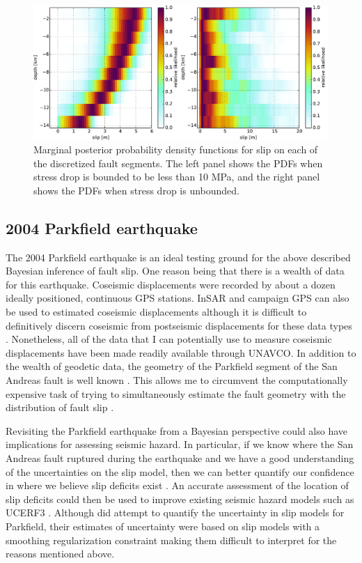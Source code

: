 \documentclass[12pt]{article}
\begin{document}
\begin{figure}
\includegraphics[width=1.0\textwidth]{figure_2}
\raggedleft
\caption{Marginal posterior probability density functions for slip on each of the discretized fault segments.  The left panel shows the PDFs when stress drop is bounded to be less than 10 MPa, and the right panel shows the PDFs when stress drop is unbounded.}  
\end{figure}

\subsection*{2004 Parkfield earthquake}
The 2004 Parkfield earthquake is an ideal testing ground for the above described Bayesian inference of fault slip.  One reason being that there is a wealth of data for this earthquake. Coseismic displacements were recorded by about a dozen ideally positioned, continuous GPS stations. InSAR and campaign GPS can also be used to estimated coseismic displacements although it is difficult to definitively discern coseismic from postseismic displacements for these data types \citep{Johanson2006}. Nonetheless, all of the data that I can potentially use to measure coseismic displacements have been made readily available through UNAVCO.  In addition to the wealth of geodetic data, the geometry of the Parkfield segment of the San Andreas fault is well known \citep{Simpson2006}.  This allows me to circumvent the computationally expensive task of trying to simultaneously estimate the fault geometry with the distribution of fault slip \citep[e.g.][]{Fukuda2008}. 

Revisiting the Parkfield earthquake from a Bayesian perspective could also have implications for assessing seismic hazard.  In particular, if we know where the San Andreas fault ruptured during the earthquake and we have a good understanding of the uncertainties on the slip model, then we can better quantify our confidence in where we believe slip deficits exist \citep{Murray2006}.  An accurate assessment of the location of slip deficits could then be used to improve existing seismic hazard models such as UCERF3 \citep{Field2014}.  Although \citet{Page2009} did attempt to quantify the uncertainty in slip models for Parkfield, their estimates of uncertainty were based on slip models with a smoothing regularization constraint making them difficult to interpret for the reasons mentioned above.
\end{document}

